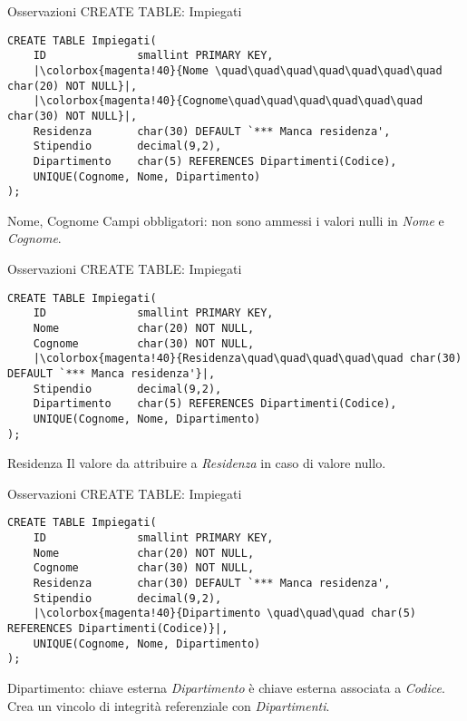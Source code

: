 %
\begin{frame}[fragile]{Osservazioni CREATE TABLE: Impiegati}
\begin{lstlisting}
CREATE TABLE Impiegati(
    ID              smallint PRIMARY KEY,
    |\colorbox{magenta!40}{Nome \quad\quad\quad\quad\quad\quad\quad char(20) NOT NULL}|,
    |\colorbox{magenta!40}{Cognome\quad\quad\quad\quad\quad\quad char(30) NOT NULL}|,
    Residenza       char(30) DEFAULT `*** Manca residenza',
    Stipendio       decimal(9,2),
    Dipartimento    char(5) REFERENCES Dipartimenti(Codice),
    UNIQUE(Cognome, Nome, Dipartimento)
);
\end{lstlisting}
\begin{block}{Nome, Cognome}
    Campi obbligatori: non sono ammessi i valori nulli in \textit{Nome} e \textit{Cognome}.
\end{block}
\end{frame}
%
\begin{frame}[fragile]{Osservazioni CREATE TABLE: Impiegati}
\begin{lstlisting}
CREATE TABLE Impiegati(
    ID              smallint PRIMARY KEY,
    Nome            char(20) NOT NULL,
    Cognome         char(30) NOT NULL,
    |\colorbox{magenta!40}{Residenza\quad\quad\quad\quad\quad char(30) DEFAULT `*** Manca residenza'}|,
    Stipendio       decimal(9,2),
    Dipartimento    char(5) REFERENCES Dipartimenti(Codice),
    UNIQUE(Cognome, Nome, Dipartimento)
);
\end{lstlisting}
\begin{minipage}{0.7\textwidth}
\begin{block}{Residenza}
    Il valore da attribuire a \textit{Residenza} in caso di valore nullo.
\end{block}
\end{minipage}
\end{frame}
%
\begin{frame}[fragile]{Osservazioni CREATE TABLE: Impiegati}
\begin{lstlisting}
CREATE TABLE Impiegati(
    ID              smallint PRIMARY KEY,
    Nome            char(20) NOT NULL,
    Cognome         char(30) NOT NULL,
    Residenza       char(30) DEFAULT `*** Manca residenza',
    Stipendio       decimal(9,2),
    |\colorbox{magenta!40}{Dipartimento \quad\quad\quad char(5) REFERENCES Dipartimenti(Codice)}|,
    UNIQUE(Cognome, Nome, Dipartimento)
);
\end{lstlisting}
\begin{block}{Dipartimento: chiave esterna}
    \textit{Dipartimento} \`e chiave esterna associata a \textit{Codice}. Crea un vincolo di integrit\`a referenziale con \textit{Dipartimenti}.
\end{block}
\end{frame}
